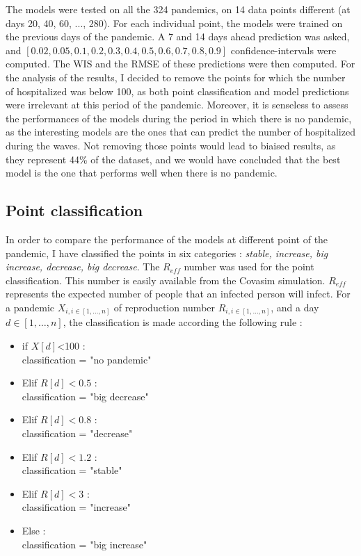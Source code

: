 The models were tested on all the 324 pandemics, on 14 data points different (at days 20, 40, 60, ..., 280). 
For each individual point, the models were trained on the previous days of the pandemic. 
A 7 and 14 days ahead prediction was asked, and $[0.02, 0.05, 0.1, 0.2, 0.3, 0.4, 0.5, 0.6, 0.7, 0.8, 0.9]$ confidence-intervals were computed. 
The WIS and the RMSE of these predictions were then computed. 
For the analysis of the results, I decided to remove the points for which the number of hospitalized was below 100, as both point classification and model predictions were irrelevant at this period of the pandemic.
Moreover, it is senseless to assess the performances of the models during the period in which there is no pandemic, as the interesting models are the ones that can predict the number of hospitalized during the waves.
Not removing those points would lead to biaised results, as they represent 44\% of the dataset, and we would have concluded that the best model is the one that performs well when there is no pandemic. 
\subsection{Point classification}
\label{sec:classification}

In order to compare the performance of the models at different point of the pandemic, I have  classified the points in six categories : \textit{stable, increase, big increase, decrease, big decrease}.
The $R_{eff}$ number was used for the point classification. 
This number is easily available from the Covasim simulation. 
$R_{eff}$ represents the expected number of people that an infected person will infect.
For a pandemic $X_{i, i \in [1, ..., n]}$ of reproduction number $R_{i, i \in [1, ..., n]}$, and a day $d \in [1, \hdots, n]$, the classification is made according the following rule : \\
\begin{itemize}
    \item if $X[d]$<100 : \\
    classification = "no pandemic"
    \item Elif $R[d] <0.5$ : \\
    classification = "big decrease"
    \item Elif $R[d] < 0.8$ : \\
    classification = "decrease"
    \item Elif $R[d] < 1.2$ : \\
    classification = "stable" 
    \item Elif $R[d] < 3$ : \\
    classification = "increase"
    \item Else : \\
    classification = "big increase"
\end{itemize}


